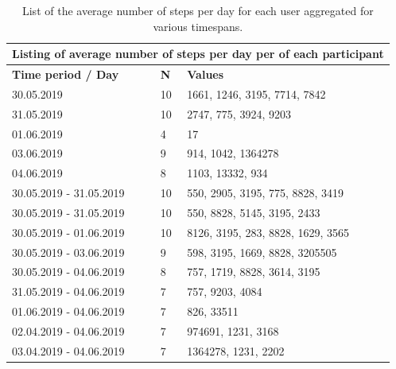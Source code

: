 \begin{table}[]
	\centering
	\begin{tabular}{|l|l|l|}
		\hline
		\multicolumn{3}{|c|}{\textbf{Listing of average number of steps per day per of each participant}} \\ \hline
		\textbf{Time period / Day}         & \textbf{N}        & \textbf{Values}                          \\ \hline
		30.05.2019                         & 10                & 1661, 1246, 3195, 7714, 7842             \\ \hline
		31.05.2019                         & 10                & 2747, 775, 3924, 9203                    \\ \hline
		01.06.2019                         & 4                 & 17                                       \\ \hline
		03.06.2019                         & 9                 & 914, 1042, 1364278                       \\ \hline
		04.06.2019                         & 8                 & 1103, 13332, 934                         \\ \hline
		30.05.2019 - 31.05.2019            & 10                & 550, 2905, 3195, 775, 8828, 3419        \\ \hline
		30.05.2019 - 31.05.2019            & 10                & 550, 8828, 5145, 3195, 2433              \\ \hline
		30.05.2019 - 01.06.2019            & 10                & 8126, 3195, 283, 8828, 1629, 3565        \\ \hline
		30.05.2019 - 03.06.2019            & 9                 & 598, 3195, 1669, 8828, 3205505           \\ \hline
		30.05.2019 - 04.06.2019            & 8                 & 757, 1719, 8828, 3614, 3195              \\ \hline
		31.05.2019 - 04.06.2019            & 7                 & 757, 9203, 4084                         \\ \hline
		01.06.2019 - 04.06.2019            & 7                 & 826, 33511                               \\ \hline
		02.04.2019 - 04.06.2019            & 7                 & 974691, 1231, 3168                       \\ \hline
		03.04.2019 - 04.06.2019            & 7                 & 1364278, 1231, 2202                      \\ \hline
	\end{tabular}
	\caption{List of the average number of steps per day for each user aggregated for various timespans.}
	\label{results-steps-listing}
\end{table}

